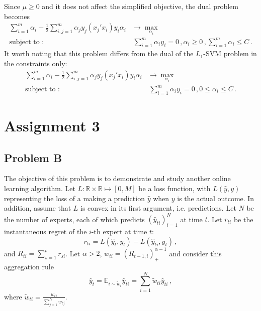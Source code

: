 \documentclass[a4paper]{article}
\newcommand{\Real}{\mathbb{R}}
\newcommand{\ex}{\mathbb{E}}
\begin{document}
Since $\mu \geq 0$ and it does not affect the simplified objective, the dual problem
becomes
\begin{align*}
  \sum_{i=1}^m \alpha_i - \frac{1}{2}
        \sum_{i,j=1}^m \alpha_j y_j (x_j'x_i) y_i \alpha_i
    &\to \max_{\alpha_i} \\
  \text{subject to :}\,
      &\,\sum_{i=1}^m \alpha_i y_i = 0
      \,,\alpha_i \geq 0
      \,,\sum_{i=1}^m \alpha_i \leq C \,.
\end{align*}
It worth noting that this problem differs from the dual of the $L_1$-SVM problem
in the constraints only:
\begin{align*}
  \sum_{i=1}^m \alpha_i - \frac{1}{2}
        \sum_{i,j=1}^m \alpha_j y_j (x_j'x_i) y_i \alpha_i
    &\to \max_{\alpha_i} \\
  \text{subject to :}\,
      &\,\sum_{i=1}^m \alpha_i y_i = 0
       \,,0 \leq \alpha_i \leq C \,.
\end{align*}




\section{Assignment 3} %
\label{sec:assignment_3}

\subsection{Problem B} %
\label{sub:problem_b}

The objective of this problem is to demonstrate and study another online learning
algorithm. Let $L:\Real\times \Real\mapsto [0, M]$ be a loss function, with $L(\hat{y}, y)$
representing the loss of a making a prediction $\hat{y}$ when $y$ is the actual
outcome. In addition, assume that $L$ is convex in its first argument, i.e. predictions.
Let $N$ be the number of experts, each of which predicts $(\hat{y}_{ti})_{i=1}^N$
at time $t$. Let $r_{ti}$ be the instantaneous regret of the $i$-th expert at time
$t$:
\begin{equation*}
  r_{ti} = L(\hat{y}_t, y_t) - L(\hat{y}_{ti}, y_t)\,,
\end{equation*}
and $R_{ti} = \sum_{s=1}^t r_{si}$. Let $\alpha > 2$, $w_{ti} = (R_{t-1,i})_+^{\alpha-1}$
and consider this aggregation rule
\begin{equation}
  \hat{y}_t
    = \ex_{i\sim \tilde{w}_t} \hat{y}_{ti}
    = \sum_{i=1}^N \tilde{w}_{ti} \hat{y}_{ti} \,,
\end{equation}
where $\tilde{w}_{ti} = \frac{w_{ti}}{\sum_{j=1}^N w_{tj}}$.
\end{document}
